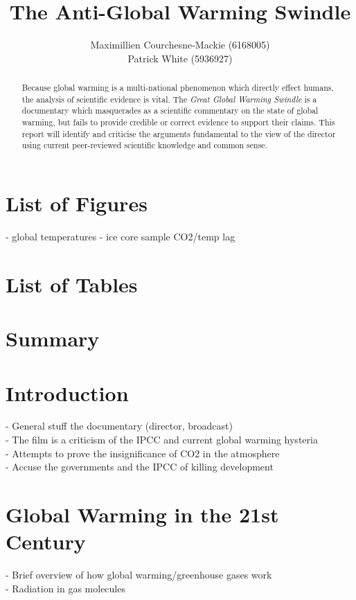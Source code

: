 \documentclass[12pt]{article}
\title{The Anti-Global Warming Swindle}
\author{Maximillien Courchesne-Mackie (6168005) \\
             Patrick White (5936927)}
\date{}
\begin{document}
\maketitle
\newpage

\begin{abstract}
    Because global warming is a multi-national phenomenon which directly effect humans, the analysis                                  of scientific evidence is vital. The \textit{Great Global Warming Swindle} is a documentary which masquerades as a scientific commentary on the state of global warming, but fails to provide credible or correct evidence to support their claims. This report will identify and criticise the arguments fundamental to the view of the director using current peer-reviewed scientific knowledge and common sense.
\end{abstract}
\newpage

\tableofcontents
\newpage

\section*{List of Figures}
    - global temperatures
    - ice core sample CO2/temp lag
\section*{List of Tables}
\newpage

\section*{Summary}
\newpage

\section{Introduction}
	- General stuff the documentary (director, broadcast) \\
	- The film is a criticism of the IPCC and current global warming hysteria \\
	- Attempts to prove the insignificance of CO2 in the atmosphere \\
	- Accuse the governments and the IPCC of killing development \\
\section{Global Warming in the 21st Century}
	- Brief overview of how global warming/greenhouse gases work\\
	- Radiation in gas molecules\\
\end{document}
